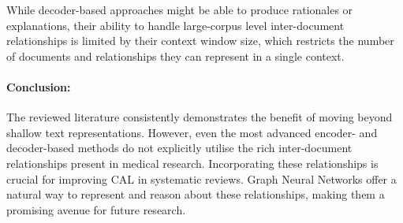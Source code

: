 \documentclass[10pt, english]{article}
\begin{document}
While decoder-based approaches might be able to produce rationales or explanations, their ability to handle large-corpus level inter-document relationships is limited by their context window size, which restricts the number of documents and relationships they can represent in a single context.

\paragraph{Conclusion: }
The reviewed literature consistently demonstrates the benefit of moving beyond shallow text representations. However, even the most advanced encoder- and decoder-based methods do not explicitly utilise the rich inter-document relationships present in medical research.  Incorporating these relationships is crucial for improving CAL in systematic reviews. Graph Neural Networks offer a natural way to represent and reason about these relationships, making them a promising avenue for future research.


\printbibliography
\end{document}
